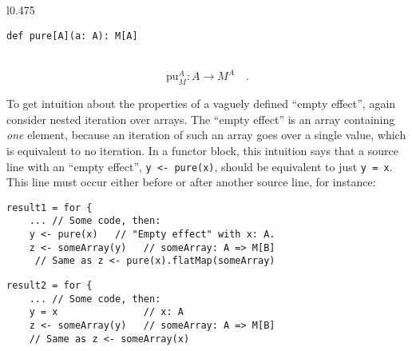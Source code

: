 \begin{wrapfigure}{l}{0.475\columnwidth}%
\vspace{-0.8\baselineskip}
\begin{lstlisting}
def pure[A](a: A): M[A]
\end{lstlisting}
\vspace{-0.6\baselineskip}
\end{wrapfigure}%

~\vspace{-0.5\baselineskip}
\[
\text{pu}_{M}^{A}:A\rightarrow M^{A}\quad.
\]

To get intuition about the properties of a vaguely defined \textsf{``}empty
effect\textsf{''}, again consider nested iteration over arrays. The \textsf{``}empty
effect\textsf{''} is an array containing \emph{one} element, because an iteration
of such an array goes over a single value, which is equivalent to
no iteration. In a functor block, this intuition says that a source
line with an \textsf{``}empty effect\textsf{''}, \lstinline!y <- pure(x)!, should
be equivalent to just \lstinline!y = x!. This line must occur either
before or after another source line, for instance:

\begin{comment}
So, we need to examine two possibilities: first, an empty effect comes
before another source line,
\end{comment}

\noindent \texttt{\textcolor{blue}{\footnotesize{}}}%
\begin{minipage}[c]{0.475\columnwidth}%
\texttt{\textcolor{blue}{\footnotesize{}}}
\begin{lstlisting}
result1 = for {
    ... // Some code, then:
    y <- pure(x)   // "Empty effect" with x: A.
    z <- someArray(y)   // someArray: A => M[B]
     // Same as z <- pure(x).flatMap(someArray)
\end{lstlisting}
%
\end{minipage}\texttt{\textcolor{blue}{\footnotesize{}\hspace*{\fill}}}%
\begin{minipage}[c]{0.475\columnwidth}%
\texttt{\textcolor{blue}{\footnotesize{}}}
\begin{lstlisting}
result2 = for {
    ... // Some code, then:
    y = x               // x: A
    z <- someArray(y)   // someArray: A => M[B]
    // Same as z <- someArray(x)
\end{lstlisting}
%
\end{minipage}{\footnotesize\par}

